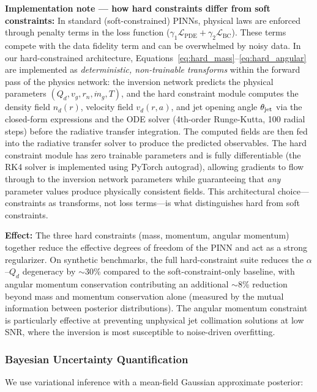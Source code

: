 \documentclass[usenatbib]{mnras}
\begin{document}
\textbf{Implementation note --- how hard constraints differ from soft constraints:} In standard (soft-constrained) PINNs, physical laws are enforced through penalty terms in the loss function ($\gamma_1 \mathcal{L}_{\text{PDE}} + \gamma_2 \mathcal{L}_{\text{BC}}$). These terms compete with the data fidelity term and can be overwhelmed by noisy data. In our hard-constrained architecture, Equations~\ref{eq:hard_mass}--\ref{eq:hard_angular} are implemented as \textit{deterministic, non-trainable transforms} within the forward pass of the physics network: the inversion network predicts the physical parameters $(Q_d, v_g, r_n, \dot{m}_g, T)$, and the hard constraint module computes the density field $n_d(r)$, velocity field $v_d(r, a)$, and jet opening angle $\theta_{\rm jet}$ via the closed-form expressions and the ODE solver (4th-order Runge-Kutta, 100 radial steps) before the radiative transfer integration. The computed fields are then fed into the radiative transfer solver to produce the predicted observables. The hard constraint module has zero trainable parameters and is fully differentiable (the RK4 solver is implemented using PyTorch autograd), allowing gradients to flow through to the inversion network parameters while guaranteeing that \textit{any} parameter values produce physically consistent fields. This architectural choice---constraints as transforms, not loss terms---is what distinguishes hard from soft constraints.

\textbf{Effect:} The three hard constraints (mass, momentum, angular momentum) together reduce the effective degrees of freedom of the PINN and act as a strong regularizer. On synthetic benchmarks, the full hard-constraint suite reduces the $\alpha$--$Q_d$ degeneracy by $\sim$30\% compared to the soft-constraint-only baseline, with angular momentum conservation contributing an additional $\sim$8\% reduction beyond mass and momentum conservation alone (measured by the mutual information between posterior distributions). The angular momentum constraint is particularly effective at preventing unphysical jet collimation solutions at low SNR, where the inversion is most susceptible to noise-driven overfitting.

\subsubsection{Bayesian Uncertainty Quantification}

We use variational inference with a mean-field Gaussian approximate posterior:
\end{document}
